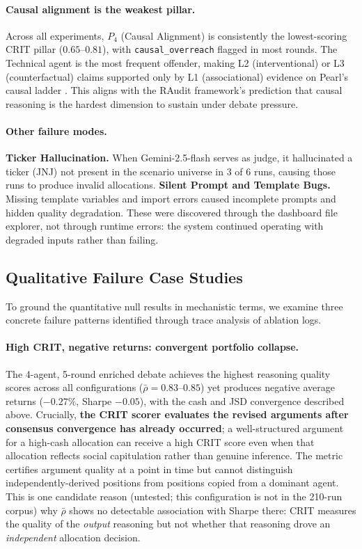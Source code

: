 \documentclass{article}
\begin{document}
\paragraph{Causal alignment is the weakest pillar.} \vspace{-0.2cm}
Across all experiments, $P_4$ (Causal Alignment) is consistently the lowest-scoring CRIT pillar ($0.65$--$0.81$), with \texttt{causal\_overreach} flagged in most rounds. The Technical agent is the most frequent offender, making L2 (interventional) or L3 (counterfactual) claims supported only by L1 (associational) evidence on Pearl's causal ladder \citep{pearl2009causality}. This aligns with the RAudit framework's prediction that causal reasoning is the hardest dimension to sustain under debate pressure.

\paragraph{Other failure modes.}
\textbf{Ticker Hallucination.} When Gemini-2.5-flash serves as judge, it hallucinated a ticker (JNJ) not present in the scenario universe in 3 of 6 runs, causing those runs to produce invalid allocations.
\textbf{Silent Prompt and Template Bugs.} Missing template variables and import errors caused incomplete prompts and hidden quality degradation. These were discovered through the dashboard file explorer, not through runtime errors: the system continued operating with degraded inputs rather than failing.

\vspace{-0.2cm}
\subsection{Qualitative Failure Case Studies}
\vspace{-0.2cm}

To ground the quantitative null results in mechanistic terms, we examine three concrete failure patterns identified through trace analysis of ablation logs.

\paragraph{High CRIT, negative returns: convergent portfolio collapse.}
The 4-agent, 5-round enriched debate achieves the highest reasoning quality scores across all configurations ($\bar{\rho}=0.83$--$0.85$) yet produces negative average returns ($-0.27\%$, Sharpe $-0.05$), with the cash and JSD convergence described above. Crucially, \textbf{the CRIT scorer evaluates the revised arguments after consensus convergence has already occurred}; a well-structured argument for a high-cash allocation can receive a high CRIT score even when that allocation reflects social capitulation rather than genuine inference. The metric certifies argument quality at a point in time but cannot distinguish independently-derived positions from positions copied from a dominant agent. This is one candidate reason (untested; this configuration is not in the 210-run corpus) why $\bar{\rho}$ shows no detectable association with Sharpe there: CRIT measures the quality of the \emph{output} reasoning but not whether that reasoning drove an \emph{independent} allocation decision.
\end{document}

